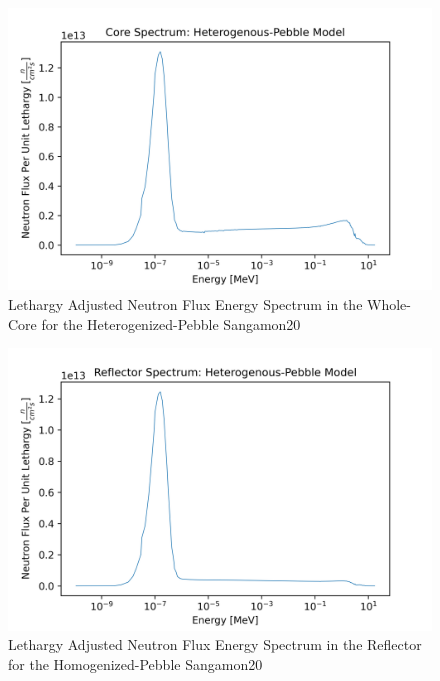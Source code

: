 \begin{figure}[H]
\centering

  \includegraphics[width=0.95\linewidth]{figures/core_spec_het_v2}
  \caption{Lethargy Adjusted Neutron Flux Energy Spectrum in the Whole-Core for the Heterogenized-Pebble Sangamon20}
  \label{fig:het-core}

\end{figure}

\begin{figure}[H]
\centering

  \includegraphics[width=0.95\linewidth]{figures/reflect_spec_het_v2}
  \caption{Lethargy Adjusted Neutron Flux Energy Spectrum in the Reflector for the Homogenized-Pebble Sangamon20}
  \label{fig:het-reflec}

\end{figure}


